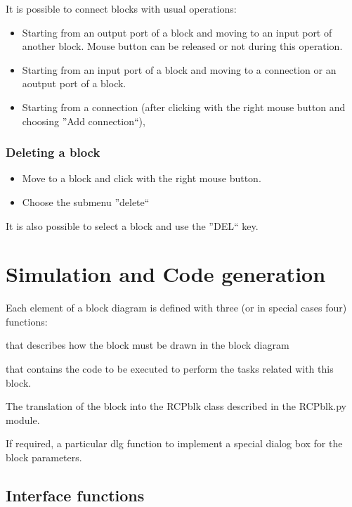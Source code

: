 It is possible to connect blocks with usual operations:

\begin{itemize}
\item Starting from an output port of a block and moving to an input port of another block. Mouse button can be released or not during this operation.
\item Starting from an input port of a block and moving to a connection or an aoutput port of a block.
\item Starting from a connection (after clicking with the right mouse button and choosing ''Add connection``),
\end{itemize}

\subsection{Deleting a block}
\begin{itemize}
\item Move to a block and click with the right mouse button.
\item Choose the submenu ''delete``
\end{itemize}

It is also possible to select a block and use the ''DEL`` key.

\chapter{Simulation and Code generation}

Each element of a block diagram is defined with three (or in special cases four) functions:

\begin{description}
\item [The interface function] that describes how the block must be drawn in the block diagram
\item [The Implementation function] that contains the code  to be executed to perform the tasks related with this block.
\item The translation of the block into the RCPblk class described in the RCPblk.py module.
\item If required, a particular dlg function to implement a special dialog box for the block parameters.
\end{description}

\section{Interface functions}

